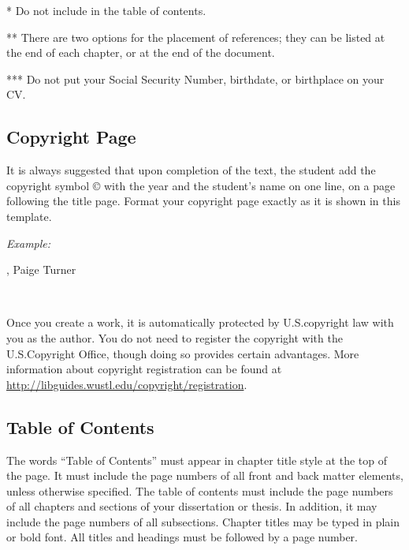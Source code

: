 \begin{table}
\begin{threeparttable}[b]
  \vspace{.5em}
  \begin{tablenotes}
    \footnotesize
    \item[*] Do not include in the table of contents.
    \item[**] There are two options for the placement of references; they can be listed at the end of each chapter, or at the end of the document.
    \item[***] Do not put your Social Security Number, birthdate, or birthplace on your CV.
  \end{tablenotes}
  \end{threeparttable}
\end{table}

\subsection{Copyright Page}

It is always suggested that upon completion of the text, the student add the copyright symbol © with the year and the student's name on one line, on a page following the title page.
Format your copyright page exactly as it is shown in this template.

\begin{minipage}[c][5cm][h]{\textwidth}
    \SingleSpace
  \textit{Example:}\\
  \centerline{, Paige Turner}\\
\end{minipage}\vspace{-22pt}

Once you create a work, it is automatically protected by U.S.\@ copyright law with you as the author.
You do not need to register the copyright with the U.S.\@ Copyright Office, though doing so provides certain advantages.
More information about copyright registration can be found at \href{http://libguides.wustl.edu/copyright/registration}{http://libguides.wustl.edu/copyright/registration}.

\subsection{Table of Contents}

The words ``Table of Contents'' must appear in chapter title style at the top of the page.
It must include the page numbers of all front and back matter elements, unless otherwise specified.
The table of contents must include the page numbers of all chapters and sections of your dissertation or thesis.
In addition, it may include the page numbers of all subsections.
Chapter titles may be typed in plain or bold font.
All titles and headings must be followed by a page number.

